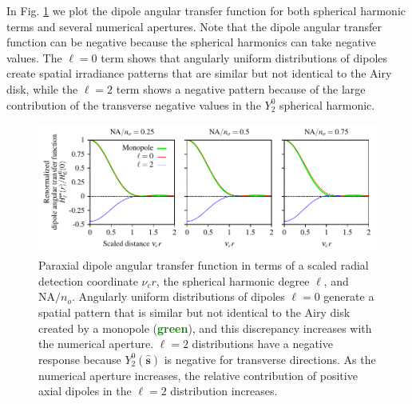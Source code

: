 \documentclass[]{osa-article}
\providecommand{\mh}[1]{\mathbf{\hat{#1}}}
\begin{document}
In Fig. \ref{fig:atf} we plot the dipole angular transfer function for both
spherical harmonic terms and several numerical apertures. Note that the dipole
angular transfer function can be negative because the spherical harmonics can
take negative values. The $\ell=0$ term shows that angularly uniform
distributions of dipoles create spatial irradiance patterns that are similar but
not identical to the Airy disk, while the $\ell=2$ term shows a negative pattern
because of the large contribution of the transverse negative values in the
$Y_2^0$ spherical harmonic.

\begin{figure}[h]
 \centering
   \centering
   \includegraphics[scale=0.8]{../figures/paratfs/adtf.pdf}
   \caption{Paraxial dipole angular transfer function in terms of a scaled
     radial detection coordinate $\nu_c r$, the spherical harmonic degree
     $\ell$, and $\text{NA}/n_o$. Angularly uniform distributions of dipoles
     $\ell=0$ generate a spatial pattern that is similar but not identical to
     the Airy disk created by a monopole (\textcolor{green}{\textbf{green}}),
     and this discrepancy increases with the numerical aperture. $\ell=2$
     distributions have a negative response because $Y_2^0(\mh{s})$ is negative
     for transverse directions. As the numerical aperture increases, the
     relative contribution of positive axial dipoles in the $\ell=2$
     distribution increases.}
   \label{fig:atf}
 \end{figure}
\end{document}
